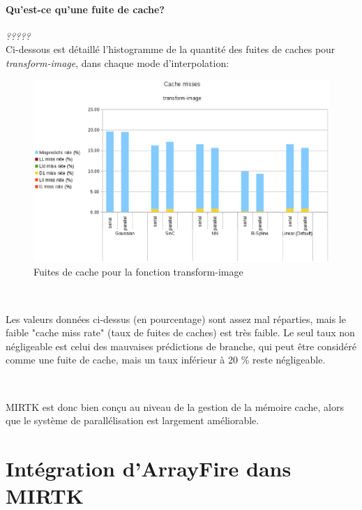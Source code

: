\documentclass[10pt]{report}
\begin{document}
	\paragraph{Qu'est-ce qu'une fuite de cache?}
	\textit{?????}\\
	Ci-dessous est détaillé l'histogramme de la quantité des fuites de caches pour \textit{transform-image}, dans chaque mode d'interpolation:
		\begin{figure}[h!]
			\begin{center}
				\includegraphics[width=15cm]{Reports/figures/cache_misses_transform_image.eps}
			\end{center}	
			\caption{Fuites de cache pour la fonction transform-image}
			\label{Fuites de cache pour la fonction transform-image}
		\end{figure}~\par
	Les valeurs données ci-dessus (en pourcentage) sont assez mal réparties, mais le faible "cache miss rate" (taux de fuites de caches) est très faible. Le seul taux non négligeable est celui des mauvaises prédictions de branche, qui peut être considéré comme une fuite de cache, mais un taux inférieur à 20 \% reste négligeable. 
	
	~\par
	MIRTK est donc bien conçu au niveau de la gestion de la mémoire cache, alors que le système de parallélisation est largement améliorable.
	
	\section{Intégration d'ArrayFire dans MIRTK}
\end{document}

